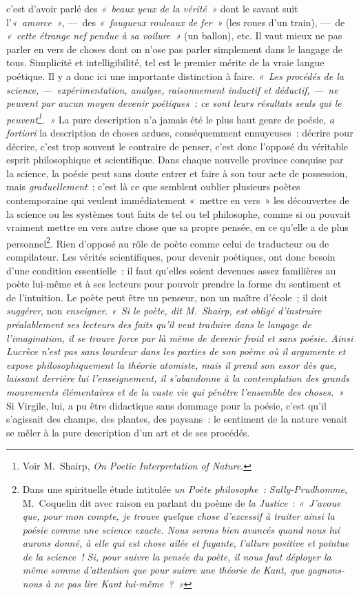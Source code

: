 \documentclass[french,twoside]{book} %
\begin{document}
\noindent c’est d’avoir parlé des \emph{« beaux yeux de la vérité »} dont le savant suit l’\emph{« amorce »}, — des \emph{« fougueux rouleaux de fer »} (les roues d’un train), — de \emph{« cette étrange nef pendue à sa voilure »} (un ballon), etc. Il vaut mieux ne pas parler en vers de choses dont on n’ose pas parler simplement dans le langage de tous. Simplicité et intelligibilité, tel est le premier mérite de la vraie langue poétique. Il y a donc ici une importante distinction à faire. \emph{« Les \emph{procédés} de la science, — expérimentation, analyse, raisonnement inductif et déductif, — ne peuvent par aucun moyen devenir poétiques : ce sont leurs \emph{résultats} seuls qui le peuvent\footnote{Voir M. Shairp, \emph{On Poetic Interpretation of Nature}.}. »} La pure description n’a jamais été le plus haut genre de poésie, \emph{a fortiori} la description de choses ardues, conséquemment ennuyeuses : décrire pour décrire, c’est trop souvent le contraire de penser, c’est donc l’opposé du véritable esprit philosophique et scientifique. Dans chaque nouvelle province conquise par la science, la poésie peut sans doute entrer et faire à son tour acte de possession, mais \emph{graduellement} ; c’est là ce que semblent oublier plusieurs poètes contemporaine qui veulent immédiatement « mettre en vers » les  découvertes de la science ou les systèmes tout faits de tel ou tel philosophe, comme si on pouvait vraiment mettre en vers autre chose que sa propre pensée, en ce qu’elle a de plus personnel\footnote{Dans une spirituelle étude intitulée \emph{un Poète philosophe : Sully-Prudhomme}, M. Coquelin dit avec raison en parlant du poème de \emph{la Justice} : \emph{« J’avoue que, pour mon compte, je trouve quelque chose d’excessif à traiter ainsi la poésie comme une science exacte. Nous serons bien avancés quand nous lui aurons donné, à elle qui est chose ailée et fuyante, l’allure positive et pointue de la science ! Si, pour suivre la pensée du poète, il nous faut déployer la même somme d’attention que pour suivre une théorie de Kant, que gagnons-nous à ne pas lire Kant lui-même ? »}}. Rien d’opposé au rôle de poète comme celui de traducteur ou de compilateur. Les vérités scientifiques, pour devenir poétiques, ont donc besoin d’une condition essentielle : il faut qu’elles soient devenues assez familières au poète lui-même et à ses lecteurs pour pouvoir prendre la forme du sentiment et de l’intuition. Le poète peut être un penseur, non un maître d’école ; il doit \emph{suggérer}, non \emph{enseigner}. \emph{« Si le poète, dit M. Shairp, est obligé d’instruire préalablement ses lecteurs des faits qu’il veut traduire dans le langage de l’imagination, il se trouve force par là même de devenir froid et sans poésie. Ainsi Lucrèce n’est pas sans lourdeur dans les parties de son poème où il \emph{argumente} et expose philosophiquement la théorie atomiste, mais il prend son essor dès que, laissant derrière lui l’enseignement, il s’abandonne à la \emph{contemplation} des grands mouvements élémentaires et de la vaste vie qui pénètre l’ensemble des choses. »} Si Virgile, lui, a pu être didactique sans dommage pour la poésie, c’est qu’il  s’agissait des champs, des plantes, des paysans : le sentiment de la nature venait se mêler à la pure description d’un art et de ses procédés.\par
\end{document}
